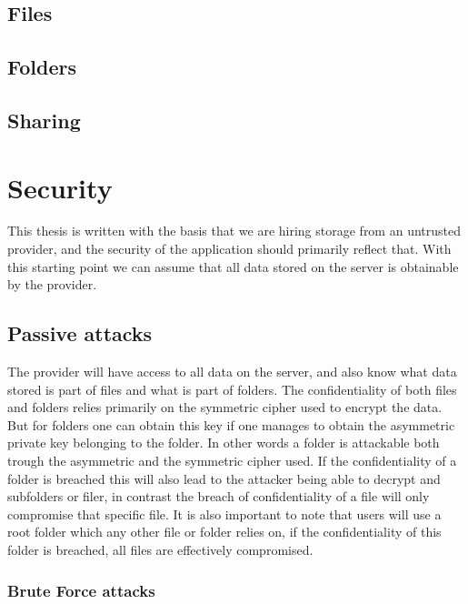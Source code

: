 \documentclass[pdftex,english,10pt,b5paper,twoside]{book}
\begin{document}
\subsection{Files}

\subsection{Folders}

\subsection{Sharing}

\section{Security}
This thesis is written with the basis that we are hiring storage from an
untrusted provider, and the security of the application should primarily
reflect that. With this starting point we can assume that all data stored on
the server is obtainable by the provider.

\subsection{Passive attacks}
The provider will have access to all data on the server, and also know what
data stored is part of files and what is part of folders. The confidentiality
of both files and folders relies primarily on the symmetric cipher used to
encrypt the data. But for folders one can obtain this key if one manages to
obtain the asymmetric private key belonging to the folder. In other words a
folder is attackable both trough the asymmetric and the symmetric cipher used.
If the confidentiality of a folder is breached this will also lead to the
attacker being able to decrypt and subfolders or filer, in contrast the breach
of confidentiality of a file will only compromise that specific file. It is
also important to note that users will use a root folder which any other file
or folder relies on, if the confidentiality of this folder is breached, all
files are effectively compromised.

\subsubsection{Brute Force attacks}
\end{document}
